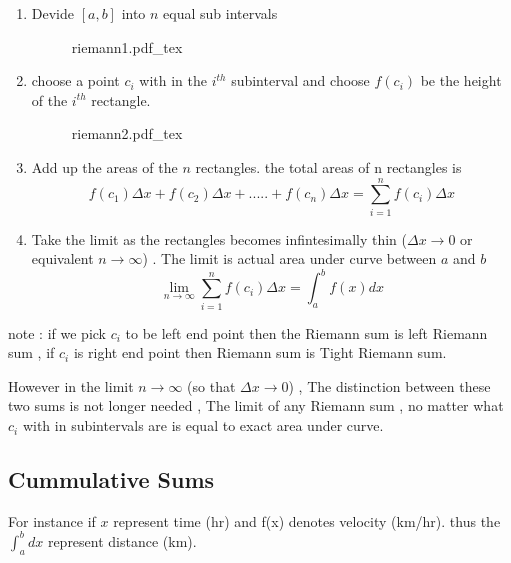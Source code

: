 \begin{enumerate}

    \item Devide $[a,b]$ into $n$ equal sub intervals 
    \begin{figure}[H]
        \centering
	\def\svgwidth{0.5\columnwidth}
	{riemann1.pdf_tex}
    \end{figure}
    \item choose a point $c_{i}$ with in the $i^{th}$ subinterval 
	 and choose $f(c_{i})$ be the height of the $i^{th}$ rectangle. 
    \begin{figure}[H]
        \centering
	\def\svgwidth{0.5\columnwidth}
	{riemann2.pdf_tex}
    \end{figure}
    \item Add up the areas of the $n$ rectangles. the  total areas 
      of n rectangles is 
      \begin{equation*}
	      f(c_{1}) \Delta x + f(c_{2}) \Delta x + .....
	      + f(c_{n}) \Delta x = \sum_{i=1}^{n}f(c_{i}) \Delta x
      \end{equation*}
      \item Take the limit as the rectangles becomes infintesimally thin
	      ($\Delta x \to 0$ or equivalent $n \to \infty$) . The limit
	is actual area under curve between $a$ and $b$ 
	\begin{equation*}
	    \lim_{n \to \infty} \sum_{i= 1}^{n} f(c_{i}) \Delta x
	    = \int^{b}_{a} f(x) dx
	\end{equation*}
\end{enumerate}
note : if we pick $c_{i}$ to be left end point then the Riemann sum 
is left Riemann sum , if $c_{i}$ is right end point then Riemann sum is Tight Riemann sum.

However in the limit $n\to \infty$ (so that $\Delta x \to 0$) , The 
distinction between these two sums is not longer needed , The limit 
of any Riemann sum , no matter what $c_{i}$ with in subintervals are is 
equal to exact area under curve. 
    
\subsection{Cummulative Sums}
For instance if $x$ represent time (hr) and f(x) denotes velocity 
(km/hr). thus the $\int^{b}_{a} dx$ represent distance (km).
